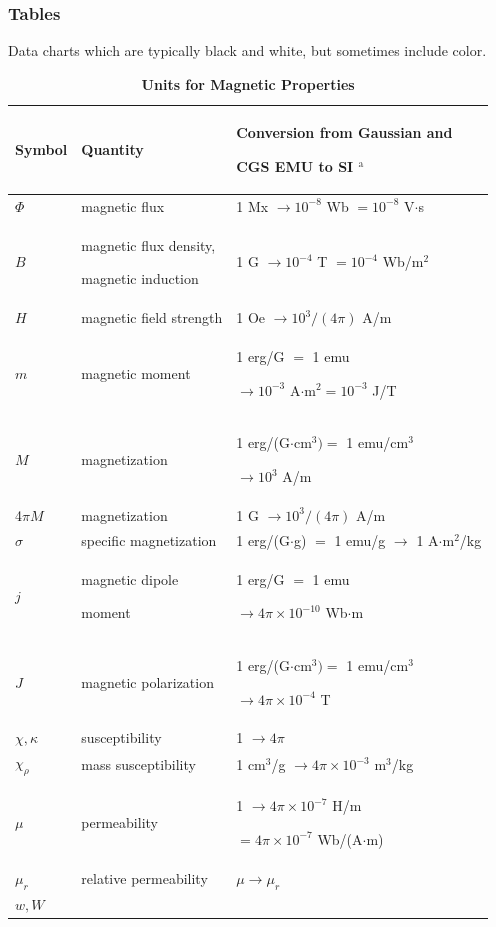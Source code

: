 \documentclass{ieeeaccess}
\begin{document}
\subsubsection{Tables}
{Data charts which are typically black and white, but sometimes include
color.}

\begin{table}
\caption{\textbf{Units for Magnetic Properties}}
\label{table}
\setlength{\tabcolsep}{3pt}
\begin{tabular}{|p{25pt}|p{75pt}|p{115pt}|}
\hline
Symbol&
Quantity&
Conversion from Gaussian and \par CGS EMU to SI $^{\mathrm{a}}$ \\
\hline
$\Phi $&
magnetic flux&
1 Mx $\to  10^{-8}$ Wb $= 10^{-8}$ V$\cdot $s \\
$B$&
magnetic flux density, \par magnetic induction&
1 G $\to  10^{-4}$ T $= 10^{-4}$ Wb/m$^{2}$ \\
$H$&
magnetic field strength&
1 Oe $\to  10^{3}/(4\pi )$ A/m \\
$m$&
magnetic moment&
1 erg/G $=$ 1 emu \par $\to 10^{-3}$ A$\cdot $m$^{2} = 10^{-3}$ J/T \\
$M$&
magnetization&
1 erg/(G$\cdot $cm$^{3}) =$ 1 emu/cm$^{3}$ \par $\to 10^{3}$ A/m \\
4$\pi M$&
magnetization&
1 G $\to  10^{3}/(4\pi )$ A/m \\
$\sigma $&
specific magnetization&
1 erg/(G$\cdot $g) $=$ 1 emu/g $\to $ 1 A$\cdot $m$^{2}$/kg \\
$j$&
magnetic dipole \par moment&
1 erg/G $=$ 1 emu \par $\to 4\pi \times  10^{-10}$ Wb$\cdot $m \\
$J$&
magnetic polarization&
1 erg/(G$\cdot $cm$^{3}) =$ 1 emu/cm$^{3}$ \par $\to 4\pi \times  10^{-4}$ T \\
$\chi , \kappa $&
susceptibility&
1 $\to  4\pi $ \\
$\chi_{\rho }$&
mass susceptibility&
1 cm$^{3}$/g $\to  4\pi \times  10^{-3}$ m$^{3}$/kg \\
$\mu $&
permeability&
1 $\to  4\pi \times  10^{-7}$ H/m \par $= 4\pi \times  10^{-7}$ Wb/(A$\cdot $m) \\
$\mu_{r}$&
relative permeability&
$\mu \to \mu_{r}$ \\
$w, W$&

\end{tabular}
\end{table}
\end{document}
